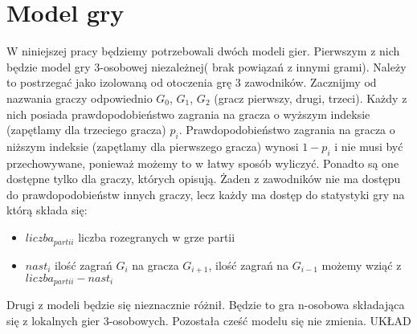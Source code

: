 \section{Model gry}
W niniejszej pracy będziemy potrzebowali dwóch modeli gier. Pierwszym z nich będzie model gry 3-osobowej niezależnej( brak powiązań z innymi grami). Należy to postrzegać jako izolowaną od otoczenia grę 3 zawodników. Zacznijmy od nazwania graczy odpowiednio $G_0$, $G_1$, $G_2$ (gracz pierwszy, drugi, trzeci). Każdy z nich posiada prawdopodobieństwo zagrania na gracza o wyższym indeksie (zapętlamy dla trzeciego gracza) $p_i$. Prawdopodobieństwo zagrania na gracza o niższym indeksie (zapętlamy dla pierwszego gracza) wynosi $1 - p_i$ i nie musi być przechowywane, ponieważ możemy to w łatwy sposób wyliczyć. Ponadto są one dostępne tylko dla graczy, których opisują. Żaden z zawodników nie ma dostępu do prawdopodobieństw innych graczy, lecz każdy ma dostęp do statystyki gry na którą składa się:
\begin{itemize}
\item $liczba_{partii}$ liczba rozegranych w grze partii
\item $nast_i$ ilość zagrań $G_i$ na gracza $G_{i+1}$, ilość zagrań na $G_{i-1}$ możemy wziąć z $liczba_{partii} - nast_i$
\end{itemize}
Drugi z modeli będzie się nieznacznie różnił. Będzie to gra n-osobowa składająca się z lokalnych gier 3-osobowych. Pozostała cześć modelu się nie zmienia.
{\color{red} UKŁAD}
